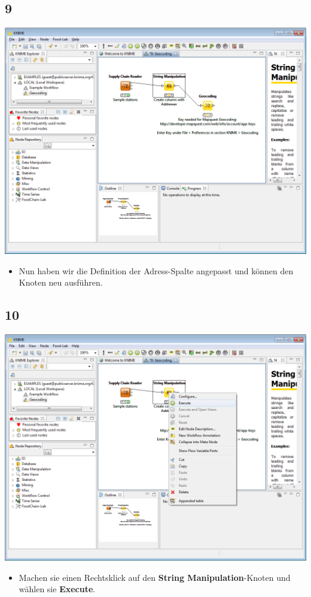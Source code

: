 \documentclass{beamer}
\begin{document}
\subsection{9}
\begin{frame}
	\begin{center}
  		\includegraphics[height=0.6\textheight]{9.png}
	\end{center}
	\begin{itemize}
		\item Nun haben wir die Definition der Adress-Spalte angepasst und können den Knoten neu ausführen.
	\end{itemize}
\end{frame}

\subsection{10}
\begin{frame}
	\begin{center}
  		\includegraphics[height=0.6\textheight]{10.png}
	\end{center}
	\begin{itemize}
		\item Machen sie einen Rechtsklick auf den \textbf{String Manipulation}-Knoten und wählen sie \textbf{Execute}.
	\end{itemize}
\end{frame}
\end{document}
